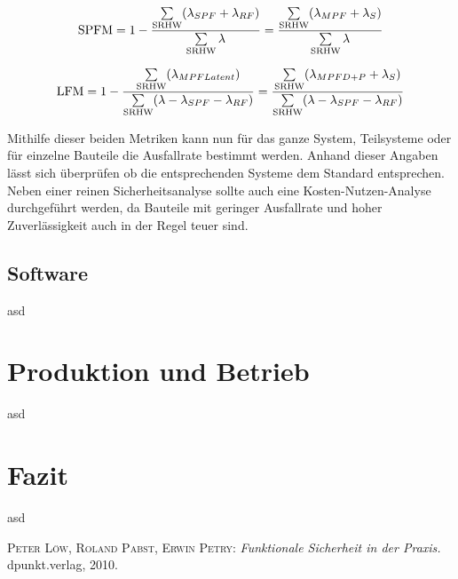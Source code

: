 \documentclass[a4paper,DIV=calc,ngerman]{scrartcl}
\begin{document}
\begin{equation}
\textnormal{SPFM} = 1 - \frac{\sum\limits_{\textnormal{SRHW}} (\lambda_{SPF} + \lambda_{RF})}{\sum\limits_{\textnormal{SRHW}} \lambda} = \frac{\sum\limits_{\textnormal{SRHW}} (\lambda_{MPF} + \lambda_{S})}{\sum\limits_{\textnormal{SRHW}} \lambda}
\label{eq:spfm}
\end{equation}

\begin{equation}
\textnormal{LFM} = 1 - \frac{\sum\limits_{\textnormal{SRHW}} (\lambda_{MPF Latent})}{\sum\limits_{\textnormal{SRHW}} (\lambda - \lambda_{SPF} - \lambda_{RF})} = \frac{\sum\limits_{\textnormal{SRHW}} (\lambda_{MPF D+P} + \lambda_{S})}{\sum\limits_{\textnormal{SRHW}} (\lambda - \lambda_{SPF} - \lambda_{RF})}
\label{eq:lfm}
\end{equation}

Mithilfe dieser beiden Metriken kann nun für das ganze System, Teilsysteme oder für einzelne Bauteile die Ausfallrate bestimmt werden. Anhand dieser Angaben lässt sich überprüfen ob die entsprechenden Systeme dem Standard entsprechen. Neben einer reinen Sicherheitsanalyse sollte auch eine Kosten-Nutzen-Analyse durchgeführt werden, da Bauteile mit geringer Ausfallrate und hoher Zuverlässigkeit auch in der Regel teuer sind.




\subsection{Software}
\label{sec:Software}
asd




\section{Produktion und Betrieb}
\label{sec:}
asd





\section{Fazit}
\label{sec:Fazit}
asd




\begin{thebibliography}{------}
\label{sec:Literatur}

 \textsc{Peter Löw, Roland Pabst, Erwin Petry}: {\em Funktionale Sicherheit in der Praxis.} dpunkt.verlag, 2010.

\end{thebibliography}
\end{document}
